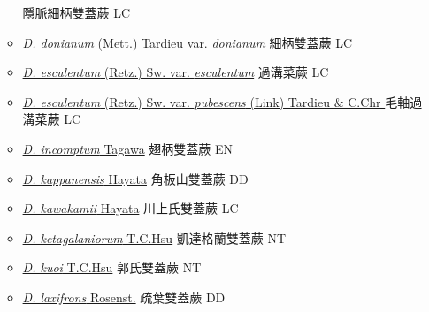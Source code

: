 \begin{itemize}
\begin{itemize}
                                        隱脈細柄雙蓋蕨   LC
        \item[] \href{http://www.theplantlist.org/tpl1.1/search?q=Diplazium+donianum+var.+donianum}{\textit{D. donianum} (Mett.) Tardieu var. \textit{donianum}}  
                                        細柄雙蓋蕨   LC
        \item[] \href{http://www.theplantlist.org/tpl1.1/search?q=Diplazium+esculentum+var.+esculentum}{\textit{D. esculentum} (Retz.) Sw. var. \textit{esculentum}}  
                                        過溝菜蕨   LC
        \item[] \href{http://www.theplantlist.org/tpl1.1/search?q=Diplazium+esculentum+var.+pubescens}{\textit{D. esculentum} (Retz.) Sw. var. \textit{pubescens} (Link) Tardieu \& C.Chr }  
                                        毛軸過溝菜蕨   LC
        \item[] \href{http://www.theplantlist.org/tpl1.1/search?q=Diplazium+incomptum}{\textit{D. incomptum} Tagawa}   翅柄雙蓋蕨   EN
        \item[] \href{http://www.theplantlist.org/tpl1.1/search?q=Diplazium+kappanensis}{\textit{D. kappanensis} Hayata}   角板山雙蓋蕨   DD
        \item[] \href{http://www.theplantlist.org/tpl1.1/search?q=Diplazium+kawakamii}{\textit{D. kawakamii} Hayata}   川上氏雙蓋蕨   LC
        \item[] \href{http://www.theplantlist.org/tpl1.1/search?q=Diplazium+ketagalaniorum}{\textit{D. ketagalaniorum} T.C.Hsu}   凱達格蘭雙蓋蕨   NT
        \item[] \href{http://www.theplantlist.org/tpl1.1/search?q=Diplazium+kuoi}{\textit{D. kuoi} T.C.Hsu}   郭氏雙蓋蕨   NT
        \item[] \href{http://www.theplantlist.org/tpl1.1/search?q=Diplazium+laxifrons}{\textit{D. laxifrons} Rosenst.}   疏葉雙蓋蕨   DD

\end{itemize}
\end{itemize}
